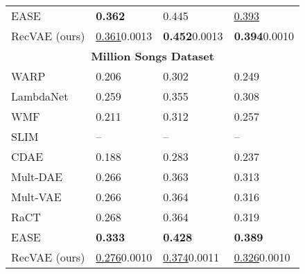 \documentclass[sigconf,authorversion]{acmart}
\begin{document}
\begin{table}[!t]
\begin{tabular}{l|l|l|l}
EASE     \cite{steck2019embarrassingly}& \textbf{0.362} & 0.445 & \underline{0.393} \\
RecVAE (ours)                          & \underline{0.361}{\small0.0013} & \textbf{0.452}{\small0.0013} & \textbf{0.394}{\small0.0010} \\ \midrule
\multicolumn{4}{c}{\bf Million Songs Dataset} \\\midrule
WARP     \cite{weston2011wsabie}       &  0.206 & 0.302 & 0.249 \\
LambdaNet\cite{burges2007learning}     &  0.259 & 0.355 & 0.308 \\
WMF      \cite{hu2008collaborative}    &  0.211 & 0.312 & 0.257 \\
SLIM     \cite{ning2011slim}           &  --    & --    & --    \\
CDAE     \cite{wu2016collaborative}    &  0.188 & 0.283 & 0.237 \\
Mult-DAE \cite{liang2018variational}   &  0.266 & 0.363 & 0.313 \\
Mult-VAE \cite{liang2018variational}   &  0.266 & 0.364 & 0.316 \\
RaCT     \cite{lobel2019towards}       &  0.268 & 0.364 & 0.319 \\
EASE     \cite{steck2019embarrassingly}&  \textbf{0.333} & \textbf{0.428} & \textbf{0.389} \\
RecVAE (ours)                          &  \underline{0.276}{\small0.0010} & \underline{0.374}{\small0.0011} & \underline{0.326}{\small0.0010} \\ \bottomrule
\end{tabular}
\vspace{5pt}
\label{tab:vae-scores-last}\vspace{-.4cm}
\end{table}
\end{document}
